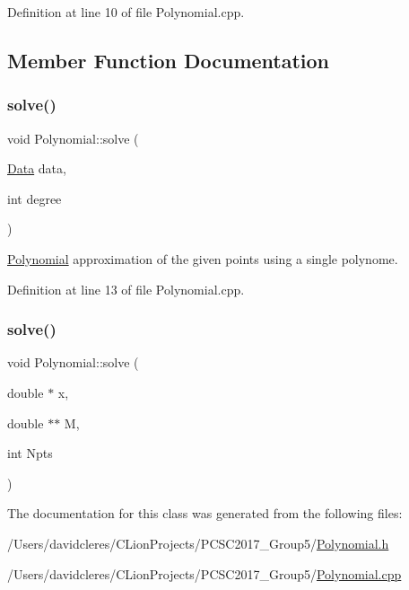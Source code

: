 Definition at line 10 of file Polynomial.\+cpp.



\subsection{Member Function Documentation}
\mbox{\label{class_polynomial_ab171b804b169ec3642cf0f86a6ee995b}} 
\subsubsection{\texorpdfstring{solve()}{solve()}\hspace{0.1cm}{\footnotesize\ttfamily [1/2]}}
{\footnotesize\ttfamily void Polynomial\+::solve (\begin{DoxyParamCaption}\item[{\mbox{\hyperlink{struct_data}{Data}}}]{data,  }\item[{int}]{degree }\end{DoxyParamCaption})}



\mbox{\hyperlink{class_polynomial}{Polynomial}} approximation of the given points using a single polynome. 



Definition at line 13 of file Polynomial.\+cpp.

\mbox{\label{class_polynomial_ac954ae1f64db7fab5b16ab60fc3f6709}} 
\subsubsection{\texorpdfstring{solve()}{solve()}\hspace{0.1cm}{\footnotesize\ttfamily [2/2]}}
{\footnotesize\ttfamily void Polynomial\+::solve (\begin{DoxyParamCaption}\item[{double $\ast$}]{x,  }\item[{double $\ast$$\ast$}]{M,  }\item[{int}]{Npts }\end{DoxyParamCaption})}



The documentation for this class was generated from the following files\+:\begin{DoxyCompactItemize}
\item 
/\+Users/davidcleres/\+C\+Lion\+Projects/\+P\+C\+S\+C2017\+\_\+\+Group5/\mbox{\hyperlink{_polynomial_8h}{Polynomial.\+h}}\item 
/\+Users/davidcleres/\+C\+Lion\+Projects/\+P\+C\+S\+C2017\+\_\+\+Group5/\mbox{\hyperlink{_polynomial_8cpp}{Polynomial.\+cpp}}\end{DoxyCompactItemize}
